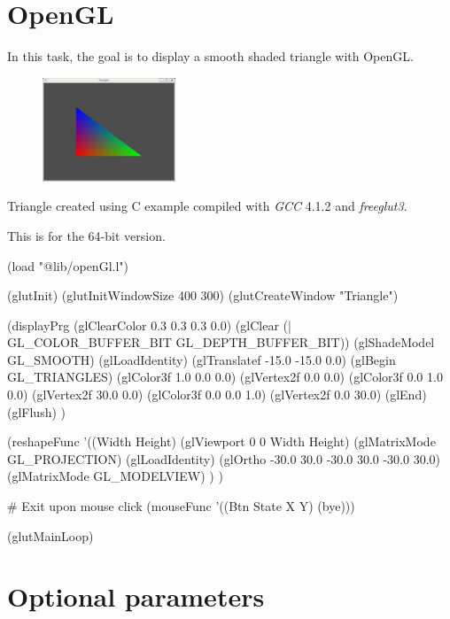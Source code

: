 \pagebreak{}
\section*{OpenGL}

In this task, the goal is to display a smooth shaded triangle with
OpenGL.

\begin{figure}[H]
\centering
\includegraphics[scale=.6]{graphics/150px-Triangle.png}
\end{figure}


Triangle created using C example compiled with \emph{GCC} 4.1.2 and
\emph{freeglut3}.


\begin{wideverbatim}

This is for the 64-bit version.

(load "@lib/openGl.l")

(glutInit)
(glutInitWindowSize 400 300)
(glutCreateWindow "Triangle")

(displayPrg
   (glClearColor 0.3 0.3 0.3 0.0)
   (glClear (| GL_COLOR_BUFFER_BIT GL_DEPTH_BUFFER_BIT))
   (glShadeModel GL_SMOOTH)
   (glLoadIdentity)
   (glTranslatef -15.0 -15.0 0.0)
   (glBegin GL_TRIANGLES)
   (glColor3f 1.0 0.0 0.0)
   (glVertex2f 0.0 0.0)
   (glColor3f 0.0 1.0 0.0)
   (glVertex2f 30.0 0.0)
   (glColor3f 0.0 0.0 1.0)
   (glVertex2f 0.0 30.0)
   (glEnd)
   (glFlush) )

(reshapeFunc
   '((Width Height)
      (glViewport 0 0 Width Height)
      (glMatrixMode GL_PROJECTION)
      (glLoadIdentity)
      (glOrtho -30.0 30.0 -30.0 30.0 -30.0 30.0)
      (glMatrixMode GL_MODELVIEW) ) )

# Exit upon mouse click
(mouseFunc '((Btn State X Y) (bye)))

(glutMainLoop)

\end{wideverbatim}

\pagebreak{}
\section*{Optional parameters}

